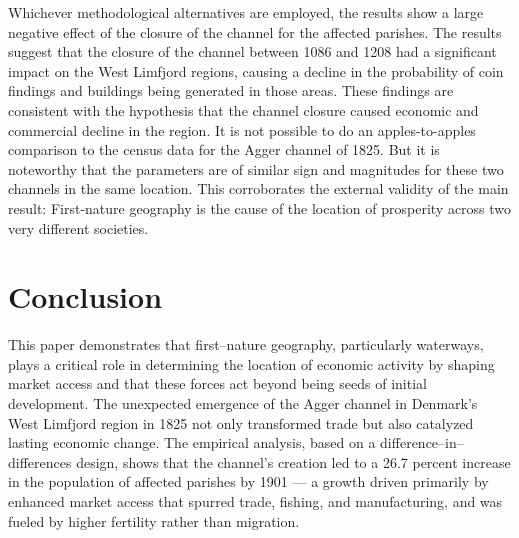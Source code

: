 \documentclass[12pt]{article}
\begin{document}
\begin{landscape}
\begin{table}
\centering
\caption{Archaeological regression results} \label{tab:arch1}
\footnotesize

\parbox{1.3\textwidth}{
\caption*{\footnotesize \textit{Notes:} Results from regressions on the probability that a given finding type was generated within $\pm$25 years in a parish. Standard errors (in parentheses) are clustered at the parish level and derived via bootstrapping of Monte Carlo samples. Columns 1-4 use the full sample and columns 5-8 use a matched sample; even columns use the dummy measure and odd columns the change in market access approach. Estimates for all years (750, 800, …, 1500) are provided in Appendix \ref{all_arch_param}. *** $p<0.01$, ** $p<0.05$, * $p<0.10$. \\ \textit{Source: Danish registry of archaeological findings}}
}
\end{table}
\end{landscape}


Whichever methodological alternatives are employed, the results show a large negative effect of the closure of the channel for the affected parishes. The results suggest that the closure of the channel between 1086 and 1208 had a significant impact on the West Limfjord regions, causing a decline in the probability of coin findings and buildings being generated in those areas. These findings are consistent with the hypothesis that the channel closure caused economic and commercial decline in the region. It is not possible to do an apples-to-apples comparison to the census data for the Agger channel of 1825. But it is noteworthy that the parameters are of similar sign and magnitudes for these two channels in the same location. This corroborates the external validity of the main result: First-nature geography is the cause of the location of prosperity across two very different societies. 

\FloatBarrier
\section{Conclusion}
This paper demonstrates that first–nature geography, particularly waterways, plays a critical role in determining the location of economic activity by shaping market access and that these forces act beyond being seeds of initial development. The unexpected emergence of the Agger channel in Denmark’s West Limfjord region in 1825 not only transformed trade but also catalyzed lasting economic change. The empirical analysis, based on a difference–in–differences design, shows that the channel’s creation led to a 26.7 percent increase in the population of affected parishes by 1901 — a growth driven primarily by enhanced market access that spurred trade, fishing, and manufacturing, and was fueled by higher fertility rather than migration.
\end{document}
